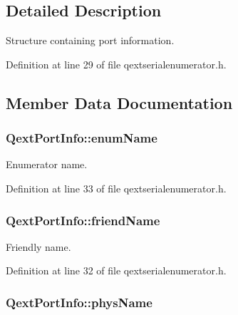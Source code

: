 \subsection{Detailed Description}
Structure containing port information. 

Definition at line 29 of file qextserialenumerator.\-h.



\subsection{Member Data Documentation}
\hypertarget{struct_qext_port_info_a47a6287c969ce9797b87f9ffdf36763c}{
\subsubsection[{enum\-Name}]{ Qext\-Port\-Info\-::enum\-Name}}\label{struct_qext_port_info_a47a6287c969ce9797b87f9ffdf36763c}


Enumerator name. 



Definition at line 33 of file qextserialenumerator.\-h.

\hypertarget{struct_qext_port_info_a1bf41f0d6c577f87161f4fdb077fb952}{
\subsubsection[{friend\-Name}]{ Qext\-Port\-Info\-::friend\-Name}}\label{struct_qext_port_info_a1bf41f0d6c577f87161f4fdb077fb952}


Friendly name. 



Definition at line 32 of file qextserialenumerator.\-h.

\hypertarget{struct_qext_port_info_a9bb0593dbd5bc1a0fc081e61268eaf46}{
\subsubsection[{phys\-Name}]{ Qext\-Port\-Info\-::phys\-Name}}\label{struct_qext_port_info_a9bb0593dbd5bc1a0fc081e61268eaf46}


